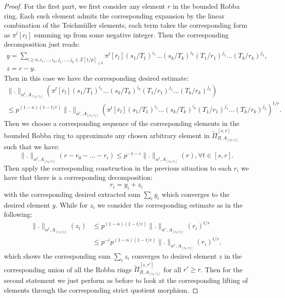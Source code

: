 \documentclass[12pt]{amsart}
\theoremstyle{definition}
\numberwithin{equation}{section}
\begin{document}
\begin{proof}
For the first part, we first consider any element $r$ in the bounded Robba ring. Each such element admits the corresponding expansion by the linear combination of the Teichm\"uller elements, each term takes the corresponding form as $\pi^l[r_{l}]$ summing up from some negative integer. Then the corresponding decomposition just reads:
\begin{align}
y=\sum_{l\geq n,i_1,...,i_k,j_1,...,j_k\in \mathbb{Z}[1/p]_{\geq 0}}\pi^l[\overline{r}_{l}](s_1/T_1)^{i_1}...(s_k/T_k)^{i_k}(T_1/r_1)^{j_1}...(T_k/r_k)^{j_k},\\
z=r-y.	
\end{align}
Then in this case we have the corresponding desired estimate:
\begin{align}
\|.\|_{\alpha^t,A_{[s_I,r_I]}}(\pi^l[\overline{r}_{l}](s_1/T_1)^{i_1}...(s_k/T_k)^{i_k}(T_1/r_1)^{j_1}...(T_k/r_k)^{j_k})\\
\leq p^{(1-n)(1-t/r)}\|.\|_{\alpha^r,A_{[s_I,r_I]}}(\pi^l[\overline{r}_{l}](s_1/T_1)^{i_1}...(s_k/T_k)^{i_k}(T_1/r_1)^{j_1}...(T_k/r_k)^{j_k})^{t/r}.
\end{align}
 Then we choose a corresponding sequence of the corresponding elements in the bounded Robba ring to approximate any chosen arbitrary element in $\widetilde{\Pi}^{[s,r]}_{R,A_{[s_I,r_I]}}$ such that we have:
 \begin{displaymath}
 \|.\|_{\alpha^t,A_{[s_I,r_I]}}(r-r_0-...-r_i)\leq p^{-1-i}  \|.\|_{\alpha^t,A_{[s_I,r_I]}}(r),\forall t\in [s,r].	
 \end{displaymath}
Then apply the corresponding construction in the previous situation to each $r_i$ we have that there is a corresponding decomposition:
\begin{displaymath}
r_i=y_i+z_i	
\end{displaymath}
with the corresponding desired extracted sum $\sum_{i}y_i$ which converges to the desired element $y$. While for $z_i$ we consider the corresponding estimate as in the following:
\begin{align}
 \|.\|_{\alpha^t,A_{[s_I,r_I]}}(z_i) &\leq  p^{(1-n)(1-t/r)}\|.\|_{\alpha^r,A_{[s_I,r_I]}}(r_i)^{t/r}\\
 &\leq p^{-i}p^{(1-n)(1-t/r)}\|.\|_{\alpha^r,A_{[s_I,r_I]}}(r_i)^{t/r},	
\end{align}
which shows the corresponding sum $\sum_i z_i$ converges to desired element $z$ in the corresponding union of all the Robba rings $\widetilde{\Pi}^{[s,r']}_{R,A_{[s_I,r_I]}}$ for all $r'\geq r$. Then for the second statement we just perform as before to look at the corresponding lifting of elements through the corresponding strict quotient morphism.
 
\end{proof}
\end{document}
